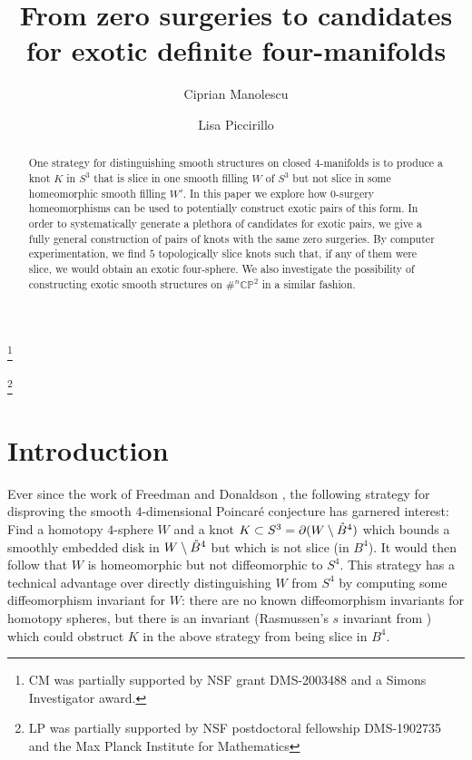 \documentclass [11pt]{amsart}
\theoremstyle{remark}
\def\CP{\mathbb{CP}^2}
\newcommand\intB{\smash{\mathring{B}^4}}
\begin{document}
\title{From zero surgeries to candidates for exotic definite four-manifolds}

\author[Ciprian Manolescu]{Ciprian Manolescu}
\address {Department of Mathematics, Stanford University\\
Stanford, CA 94305}
\thanks {CM was partially supported by NSF grant DMS-2003488 and a Simons Investigator award.}

\author[Lisa Piccirillo]{Lisa Piccirillo}
\address{Department of Mathematics, Massachusetts Institute of Technology\\
Cambridge, MA 02139}
\thanks{LP was partially supported by NSF postdoctoral fellowship DMS-1902735 and the Max Planck Institute for Mathematics} 

\begin{abstract}
One strategy for distinguishing smooth structures on closed $4$-manifolds is to produce a knot $K$ in $S^3$ that is slice in one smooth filling $W$ of $S^3$ but not slice in some homeomorphic smooth filling $W'$. In this paper we explore how $0$-surgery homeomorphisms can be used to potentially construct exotic pairs of this form. In order to systematically generate a plethora of candidates for exotic pairs, we give a fully general construction of pairs of knots with the same zero surgeries. By computer experimentation, we find $5$ topologically slice knots such that, if any of them were slice, we would obtain an exotic four-sphere. We also investigate the possibility of constructing exotic smooth structures on $\#^n \CP$ in a similar fashion. 
\end{abstract}



\maketitle

\section{Introduction}
Ever since the work of Freedman \cite{Freedman} and Donaldson \cite{Donaldson}, the following strategy for disproving the smooth $4$-dimensional Poincar\'e conjecture has garnered interest: Find a homotopy $4$-sphere $W$ and a knot $K \subset S^3=\partial(W \setminus \intB)$ which bounds a smoothly embedded disk in $W \setminus \intB$ but which is not slice (in $B^4$). It would then follow that $W$ is homeomorphic but not diffeomorphic to $S^4$. This strategy has a technical advantage over directly distinguishing $W$ from $S^4$ by computing some diffeomorphism invariant for $W$: there are no known diffeomorphism invariants for homotopy spheres, but there is an invariant (Rasmussen's $s$ invariant from \cite{Rasmussen}) which could obstruct $K$ in the above strategy from being slice in $B^4$. 
\end{document}
